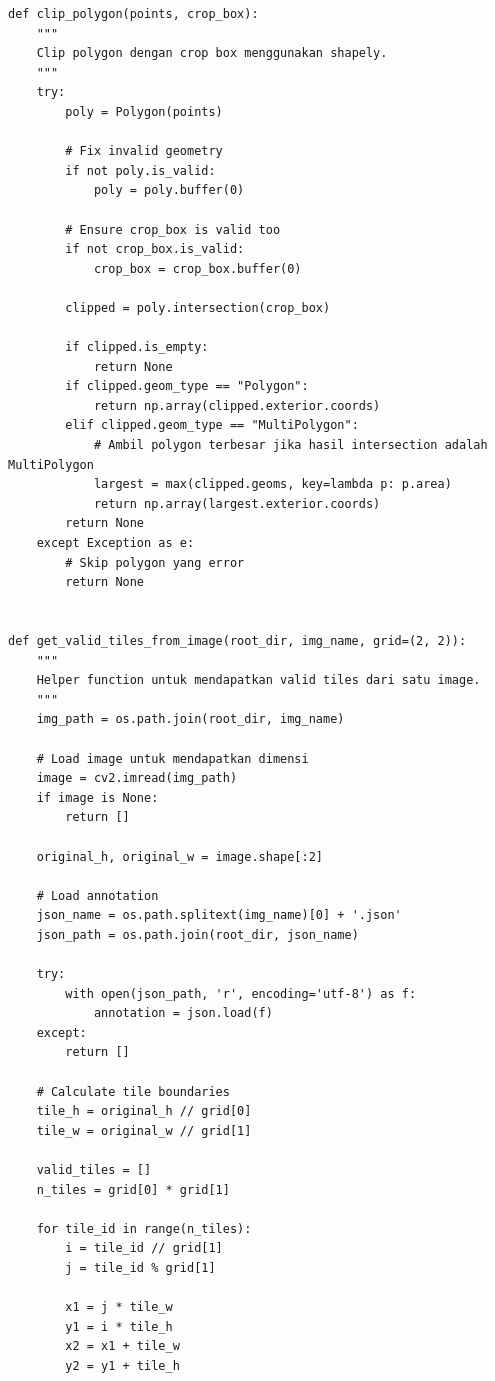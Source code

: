 \begin{lstlisting}[caption={Proses Pembagian Citra (\textit{Image Tiling})}, label={code:4.image_tiling}]
def clip_polygon(points, crop_box):
    """
    Clip polygon dengan crop box menggunakan shapely.
    """
    try:
        poly = Polygon(points)
        
        # Fix invalid geometry
        if not poly.is_valid:
            poly = poly.buffer(0)
        
        # Ensure crop_box is valid too
        if not crop_box.is_valid:
            crop_box = crop_box.buffer(0)
        
        clipped = poly.intersection(crop_box)
        
        if clipped.is_empty:
            return None
        if clipped.geom_type == "Polygon":
            return np.array(clipped.exterior.coords)
        elif clipped.geom_type == "MultiPolygon":
            # Ambil polygon terbesar jika hasil intersection adalah MultiPolygon
            largest = max(clipped.geoms, key=lambda p: p.area)
            return np.array(largest.exterior.coords)
        return None
    except Exception as e:
        # Skip polygon yang error
        return None


def get_valid_tiles_from_image(root_dir, img_name, grid=(2, 2)):
    """
    Helper function untuk mendapatkan valid tiles dari satu image.
    """
    img_path = os.path.join(root_dir, img_name)
    
    # Load image untuk mendapatkan dimensi
    image = cv2.imread(img_path)
    if image is None:
        return []
    
    original_h, original_w = image.shape[:2]
    
    # Load annotation
    json_name = os.path.splitext(img_name)[0] + '.json'
    json_path = os.path.join(root_dir, json_name)
    
    try:
        with open(json_path, 'r', encoding='utf-8') as f:
            annotation = json.load(f)
    except:
        return []
    
    # Calculate tile boundaries
    tile_h = original_h // grid[0]
    tile_w = original_w // grid[1]
    
    valid_tiles = []
    n_tiles = grid[0] * grid[1]
    
    for tile_id in range(n_tiles):
        i = tile_id // grid[1]
        j = tile_id % grid[1]
        
        x1 = j * tile_w
        y1 = i * tile_h
        x2 = x1 + tile_w
        y2 = y1 + tile_h
        

\end{lstlisting}
